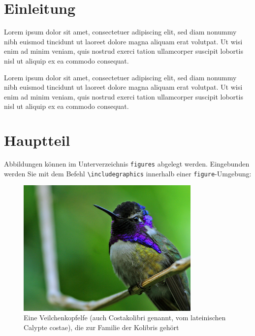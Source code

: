 
\chapter{Einleitung}
\label{chp:Einleitung}
Lorem ipsum dolor sit amet, consectetuer adipiscing elit, sed diam nonummy nibh euismod tincidunt ut laoreet dolore magna aliquam erat volutpat. Ut wisi enim ad minim veniam, quis nostrud exerci tation ullamcorper suscipit lobortis nisl ut aliquip ex ea commodo consequat. \cite{Konak2006,Sailer2013}

Lorem ipsum dolor sit amet, consectetuer adipiscing elit, sed diam nonummy nibh euismod tincidunt ut laoreet dolore magna aliquam erat volutpat. Ut wisi enim ad minim veniam, quis nostrud exerci tation ullamcorper suscipit lobortis nisl ut aliquip ex ea commodo consequat.
 
 
 \chapter{Hauptteil}
 \label{sec:Hauptteil}
 
 Abbildungen k\"{o}nnen im Unterverzeichnis \texttt{figures} abgelegt werden.
 Eingebunden werden Sie mit dem Befehl \texttt{\textbackslash includegraphics} innerhalb
 einer \texttt{figure}-Umgebung:
 \begin{figure}[htb]
 	\centering
 	\includegraphics[width=0.8\textwidth]{figures/Hummingbird.jpg}
 	\caption{Eine Veilchenkopfelfe (auch Costakolibri genannt, vom lateinischen Calypte costae), die zur Familie der Kolibris geh\"{o}rt \cite{Kolibri}}
 	\label{fig:kolibri}
 \end{figure}
 
